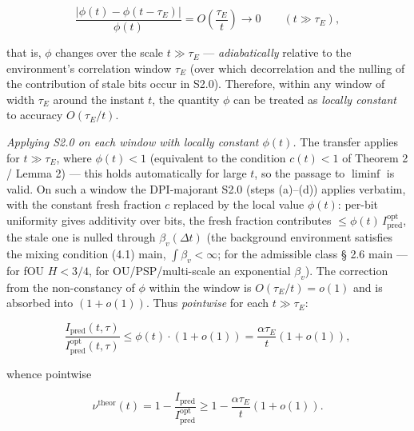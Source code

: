 \documentclass[12pt]{iopart}
\begin{document}
\[\frac{|\phi(t)-\phi(t-\tau_E)|}{\phi(t)} = O\!\left(\frac{\tau_E}{t}\right) \to 0 \qquad (t \gg \tau_E),\]



that is, \(\phi\) changes over the scale \(t \gg \tau_E\) --- \emph{adiabatically} relative to the environment's correlation window \(\tau_E\) (over which decorrelation and the nulling of the contribution of stale bits occur in S2.0). Therefore, within any window of width \(\tau_E\) around the instant \(t\), the quantity \(\phi\) can be treated as \emph{locally constant} to accuracy \(O(\tau_E/t)\).



\emph{Applying S2.0 on each window with locally constant \(\phi(t)\).} The transfer applies for \(t \gg \tau_E\), where \(\phi(t) < 1\) (equivalent to the condition \(c(t) < 1\) of Theorem 2 / Lemma 2) --- this holds automatically for large \(t\), so the passage to \(\liminf\) is valid. On such a window the DPI-majorant S2.0 (steps (a)--(d)) applies verbatim, with the constant fresh fraction \(c\) replaced by the local value \(\phi(t)\): per-bit uniformity gives additivity over bits, the fresh fraction contributes \(\le \phi(t)\,I_{\text{pred}}^{\text{opt}}\), the stale one is nulled through \(\beta_v(\Delta t)\) (the background environment satisfies the mixing condition (4.1) main, \(\int\beta_v < \infty\); for the admissible class § 2.6 main --- for fOU \(H<3/4\), for OU/PSP/multi-scale an exponential \(\beta_v\)). The correction from the non-constancy of \(\phi\) within the window is \(O(\tau_E/t) = o(1)\) and is absorbed into \((1+o(1))\). Thus \emph{pointwise} for each \(t \gg \tau_E\):



\begin{equation}\frac{I_{\text{pred}}(t,\tau)}{I_{\text{pred}}^{\text{opt}}(t,\tau)} \le \phi(t)\cdot(1+o(1)) = \frac{\alpha\tau_E}{t}(1+o(1)), \tag{S3.2a}\end{equation}



whence pointwise



\begin{equation}\nu^{\text{theor}}(t) = 1 - \frac{I_{\text{pred}}}{I_{\text{pred}}^{\text{opt}}} \ge 1 - \frac{\alpha\tau_E}{t}(1+o(1)). \tag{S3.3}\end{equation}
\end{document}
